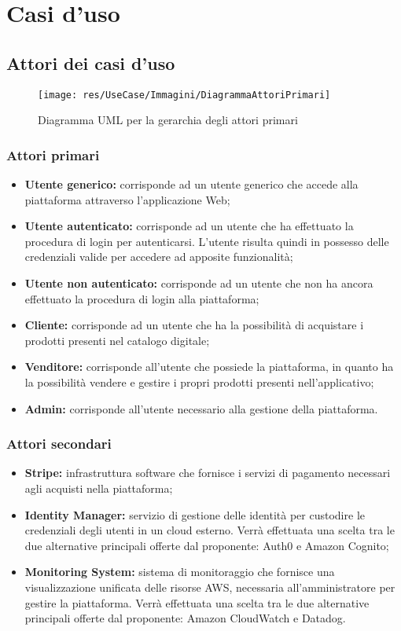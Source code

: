 \section{Casi d'uso}
\subsection{Attori dei casi d'uso}
\begin{figure}[H]
\centering
\texttt{[image: res/UseCase/Immagini/DiagrammaAttoriPrimari]}
\caption{Diagramma UML per la gerarchia degli attori primari}
\end{figure}
\subsubsection{Attori primari}
\begin{itemize}
\item \textbf{Utente generico:} corrisponde ad un utente generico che accede alla piattaforma attraverso l'applicazione Web;
\item \textbf{Utente autenticato:} corrisponde ad un utente che ha effettuato la procedura di login per autenticarsi. L'utente risulta quindi in possesso delle credenziali valide per accedere ad apposite funzionalità;
\item \textbf{Utente non autenticato:} corrisponde ad un utente che non ha ancora effettuato la procedura di login alla piattaforma;
\item \textbf{Cliente:} corrisponde ad un utente che ha la possibilità di acquistare i prodotti presenti nel catalogo digitale;
\item \textbf{Venditore:} corrisponde all'utente che possiede la piattaforma, in quanto ha la possibilità vendere e gestire i propri prodotti presenti nell'applicativo;
\item \textbf{Admin:} corrisponde all'utente necessario alla gestione della piattaforma.
\end{itemize}
\subsubsection{Attori secondari}
\begin{itemize}
\item \textbf{Stripe:} infrastruttura software che fornisce i servizi di pagamento necessari agli acquisti nella piattaforma;
\item \textbf{Identity Manager:} servizio di gestione delle identità per custodire le credenziali degli utenti in un cloud esterno. Verrà effettuata una scelta tra le due alternative principali offerte dal proponente: Auth0 e Amazon Cognito;
\item \textbf{Monitoring System:} sistema di monitoraggio che fornisce una visualizzazione unificata delle risorse AWS, necessaria all'amministratore per gestire la piattaforma. Verrà effettuata una scelta tra le due alternative principali offerte dal proponente: Amazon CloudWatch e Datadog.
\end{itemize}

